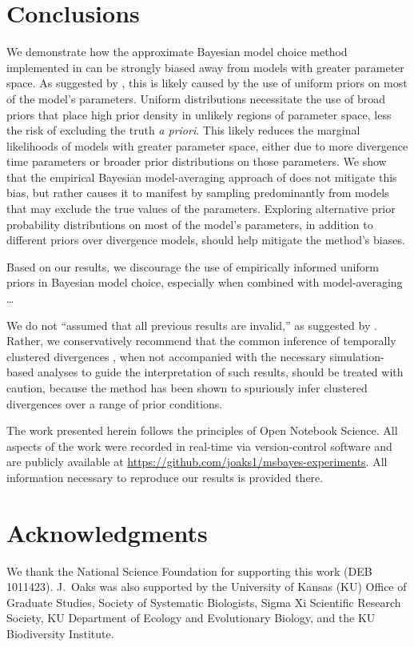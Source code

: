 \documentclass[letterpaper,12pt]{article}
\begin{document}
\begin{linenumbers}
\section*{Conclusions}
We demonstrate how the approximate Bayesian model choice method implemented in
\msb can be strongly biased away from models with greater parameter space.
As suggested by \citet{Oaks2012}, this is likely caused by the use of uniform
priors on most of the model's parameters.
Uniform distributions necessitate the use of broad priors that place high prior
density in unlikely regions of parameter space, less the risk of excluding the
truth \emph{a priori}.
This likely reduces the marginal likelihoods of models with greater parameter
space, either due to more divergence time parameters or broader prior
distributions on those parameters.
We show that the empirical Bayesian model-averaging approach of
\citet{Hickerson2013} does not mitigate this bias, but rather causes it to
manifest by sampling predominantly from models that may exclude the true values
of the parameters.
Exploring alternative prior probability distributions on most of the model's
parameters, in addition to different priors over divergence models, should
help mitigate the method's biases.

Based on our results, we discourage the use of empirically informed uniform
priors in Bayesian model choice, especially when combined with model-averaging
\ldots

We do not ``assumed that all previous \msb results are invalid,'' as suggested
by \citet{Hickerson2013}.
Rather, we conservatively recommend that the common inference of temporally
clustered divergences \citep{Barber2010, Bell2012, Carnaval2009, Chan2011,
Daza2010, Hickerson2006, Huang2011, Lawson2010, Leache2007, Plouviez2009,
Stone2012, Voje2009}, when not accompanied with the necessary simulation-based
analyses to guide the interpretation of such results, should be treated with
caution, because the method has been shown to spuriously infer clustered
divergences over a range of prior conditions.

The work presented herein follows the principles of Open Notebook Science.
All aspects of the work were recorded in real-time via version-control
software and are publicly available at
\href{https://github.com/joaks1/msbayes-experiments}{https://github.com/joaks1/msbayes-experiments}.
All information necessary to reproduce our results is provided there.


\section*{Acknowledgments}
We thank the National Science Foundation for supporting this work (DEB
1011423).
J.\ Oaks was also supported by the University of Kansas (KU) Office of Graduate
Studies, Society of Systematic Biologists, Sigma Xi Scientific Research
Society, KU Department of Ecology and Evolutionary Biology, and the KU
Biodiversity Institute.


\end{linenumbers}
\end{document}

